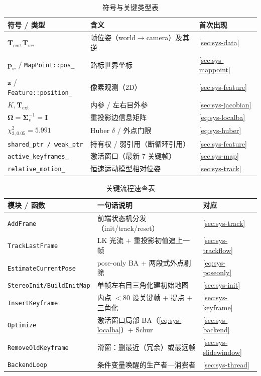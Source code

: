 \begin{table}[H]\centering\small
\caption{符号与关键类型表}
\begin{tabular}{lll}
\toprule
符号 / 类型 & 含义 & 首次出现 \\
\midrule
$\mathbf{T}_{cw},\mathbf{T}_{wc}$ & 帧位姿（world$\to$camera）及其逆 & \cref{sec:sys-data} \\
$\mathbf{p}_w$ / \texttt{MapPoint::pos\_} & 路标世界坐标 & \cref{sec:sys-mappoint} \\
$\mathbf{z}$ / \texttt{Feature::position\_} & 像素观测（2D） & \cref{sec:sys-feature} \\
$K,\mathbf{T}_{\mathrm{ext}}$ & 内参 / 左右目外参 & \cref{sec:sys-jacobian} \\
$\boldsymbol\Omega=\boldsymbol\Sigma_v^{-1}=\mathbf{I}$ & 重投影边信息矩阵 & \cref{eq:sys-localba} \\
$\chi^2_{2,0.05}=5.991$ & Huber $\delta$ / 外点门限 & \cref{eq:sys-huber} \\
\texttt{shared\_ptr / weak\_ptr} & 持有权 / 弱引用（断循环引用） & \cref{sec:sys-feature} \\
\texttt{active\_keyframes\_} & 激活窗口（最新 7 关键帧） & \cref{sec:sys-map} \\
\texttt{relative\_motion\_} & 恒速运动模型相对位姿 & \cref{sec:sys-track} \\
\bottomrule
\end{tabular}
\end{table}

\begin{table}[H]\centering\small
\caption{关键流程速查表}
\begin{tabular}{lll}
\toprule
模块 / 函数 & 一句话说明 & 对应 \\
\midrule
\texttt{AddFrame} & 前端状态机分发（init/track/reset） & \cref{sec:sys-track} \\
\texttt{TrackLastFrame} & LK 光流 + 重投影初值追上一帧 & \cref{sec:sys-trackflow} \\
\texttt{EstimateCurrentPose} & pose-only BA + 两段式外点剔除 & \cref{eq:sys-poseonly} \\
\texttt{StereoInit/BuildInitMap} & 单帧左右目三角化建初始地图 & \cref{sec:sys-init} \\
\texttt{InsertKeyframe} & 内点 $<80$ 设关键帧 + 提点 + 三角化 & \cref{sec:sys-keyframe} \\
\texttt{Optimize} & 激活窗口局部 BA（\cref{eq:sys-localba}）+ Schur & \cref{sec:sys-backend} \\
\texttt{RemoveOldKeyframe} & 滑窗：删最近（冗余）或最远帧 & \cref{sec:sys-slidewindow} \\
\texttt{BackendLoop} & 条件变量唤醒的生产者—消费者 & \cref{sec:sys-thread} \\
\bottomrule
\end{tabular}
\end{table}


